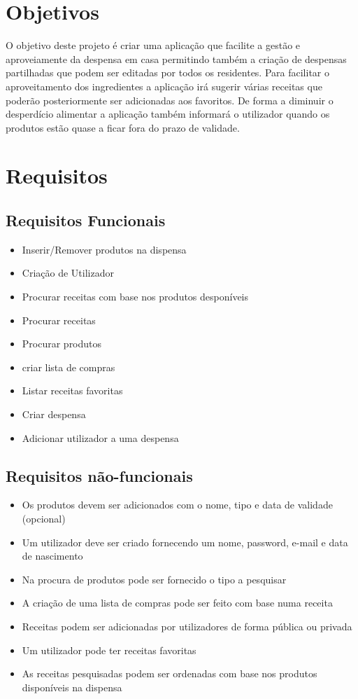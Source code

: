 \documentclass[a4paper]{report}
\begin{document}
\section{Objetivos}
O objetivo deste projeto é criar uma aplicação que facilite a gestão e
aproveiamente da despensa em casa permitindo também a criação de despensas
partilhadas que podem ser editadas por todos os residentes.
Para facilitar o aproveitamento dos ingredientes a aplicação irá sugerir várias
receitas que poderão posteriormente ser adicionadas aos favoritos. De forma a
diminuir o desperdício alimentar a aplicação também informará o utilizador
quando os produtos estão quase a ficar fora do prazo de validade.

\section{Requisitos}
\subsection{Requisitos Funcionais}
\begin{itemize}
    \item Inserir/Remover produtos na dispensa
    \item Criação de Utilizador
    \item Procurar receitas com base nos produtos desponíveis
    \item Procurar receitas
    \item Procurar produtos
    \item criar lista de compras
    \item Listar receitas favoritas
    \item Criar despensa
    \item Adicionar utilizador a uma despensa
\end{itemize}

\subsection{Requisitos não-funcionais}
\begin{itemize}
    \item Os produtos devem ser adicionados com o nome, tipo e data de validade
        (opcional)
    \item Um utilizador deve ser criado fornecendo um nome, password, e-mail e
        data de nascimento
    \item Na procura de produtos pode ser fornecido o tipo a pesquisar
    \item A criação de uma lista de compras pode ser feito com base numa receita
    \item Receitas podem ser adicionadas por utilizadores de forma pública ou
        privada
    \item Um utilizador pode ter receitas favoritas
    \item As receitas pesquisadas podem ser ordenadas com base nos produtos
        disponíveis na dispensa
\end{itemize}
\end{document}
